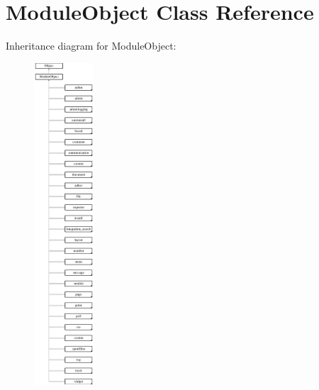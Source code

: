 \hypertarget{classModuleObject}{}\section{Module\+Object Class Reference}
\label{classModuleObject}
Inheritance diagram for Module\+Object\+:\begin{figure}[H]
\begin{center}
\leavevmode
\includegraphics[height=12.000000cm]{classModuleObject}
\end{center}
\end{figure}
